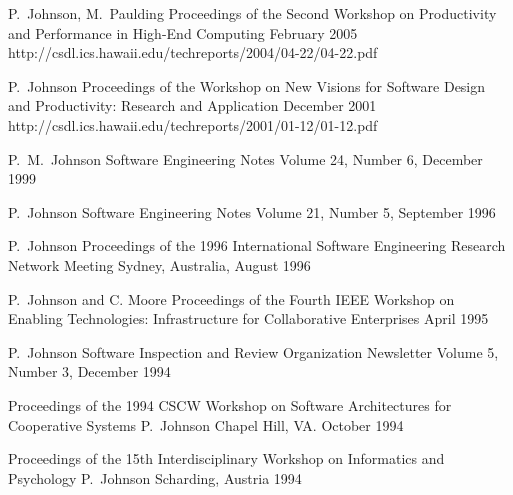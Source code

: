 \documentclass[11pt,letterpaper,sans]{moderncv} %
\begin{document}
          {P.~Johnson, M.~Paulding}
          {Proceedings of the Second Workshop on Productivity and Performance in High-End Computing}
          {February 2005}
          {http://csdl.ics.hawaii.edu/techreports/2004/04-22/04-22.pdf}

          {P.~Johnson}
          {Proceedings of the Workshop on New Visions for Software Design and Productivity: Research and Application}
          {December 2001}
          {http://csdl.ics.hawaii.edu/techreports/2001/01-12/01-12.pdf}

          {P.~M.~Johnson}
          {Software Engineering Notes}
          {Volume 24, Number 6, December 1999}

          {P.~Johnson}
          {Software Engineering Notes}
          {Volume 21, Number 5, September 1996}

          {P.~Johnson}
          {Proceedings of the 1996 International Software Engineering Research Network Meeting}
          {Sydney, Australia, August 1996}

          {P.~Johnson and C. Moore}
          {Proceedings of the Fourth IEEE Workshop on Enabling Technologies: Infrastructure for Collaborative Enterprises}
          {April 1995}

          {P.~Johnson}
          {Software Inspection and Review Organization Newsletter}
          {Volume 5, Number 3, December 1994}

          {Proceedings of the 1994 CSCW Workshop on Software Architectures for Cooperative Systems}
          {P.~Johnson}
          {Chapel Hill, VA. October 1994}

          {Proceedings of the 15th Interdisciplinary Workshop on Informatics and Psychology}
          {P.~Johnson}
          {Scharding, Austria 1994}
\end{document}
